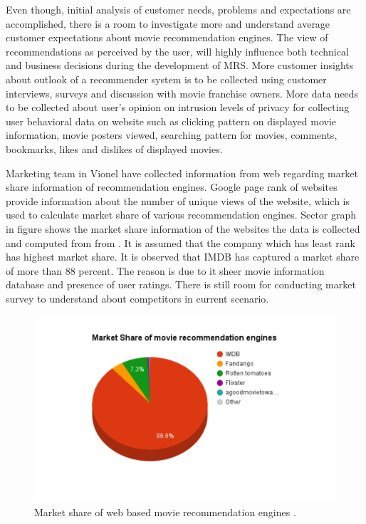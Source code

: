   Even though, initial analysis of customer needs, problems and expectations are accomplished, there is a room to investigate more and understand average customer expectations about movie recommendation engines. The view of recommendations as perceived by the user, will highly influence both technical and business decisions during the development of \acrshort{MRS}. More customer insights about outlook of a recommender system is to be collected using customer interviews, surveys and discussion with movie franchise owners. More data needs to be collected about user's opinion on intrusion levels of privacy for collecting user behavioral data on website such as clicking pattern on displayed movie information, movie posters viewed, searching pattern for movies, comments, bookmarks, likes and dislikes of displayed movies.

  Marketing team in Vionel have collected information from web regarding market share information of recommendation engines. Google page rank of websites provide information about the number of unique views of the website, which is used to calculate market share of various recommendation engines. Sector graph in figure shows the market share information of the websites the data is collected and computed from from \citep{Alexa_imdb}. It is assumed that the company which has least rank has highest market share. It is observed that \acrshort{IMDB} has captured a market share of more than 88 percent. The reason is due to it sheer movie information database and presence of user ratings. There is still room for conducting market survey to understand about competitors in current scenario.      
   
  \begin{figure}[htbp]
	\centering
		\includegraphics[scale=0.5]{Figures/Market_share.pdf}
	\caption[Sector graph: Market share of web based recommendation systems]{Market share of web based movie recommendation engines \citep{Alexa_imdb}.}
	\label{fig: Market share information of web based movie recommendation systems}
  \end{figure} 

